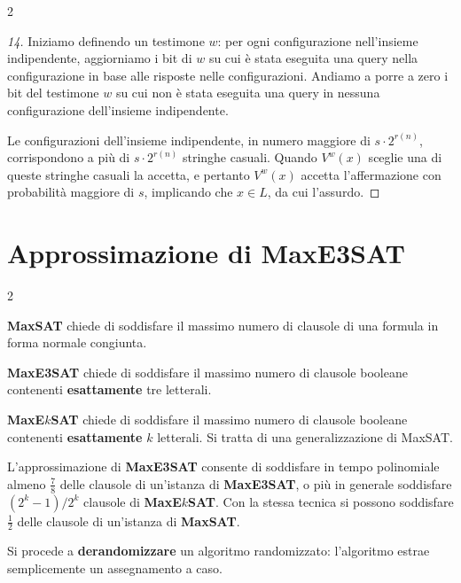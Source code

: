 \documentclass[\main/main.tex]{subfiles}
\begin{document}
\begin{multicols}{2}
\begin{proof}[14]
    Iniziamo definendo un testimone \(w\): per ogni configurazione nell'insieme indipendente, aggiorniamo i bit di \(w\) su cui è stata eseguita una query nella configurazione in base alle risposte nelle configurazioni. Andiamo a porre a zero i bit del testimone \(w\) su cui non è stata eseguita una query in nessuna configurazione dell'insieme indipendente.
    
    Le configurazioni dell'insieme indipendente, in numero maggiore di \(s \cdot 2^{r(n)}\), corrispondono a più di \(s \cdot 2^{r(n)}\) stringhe casuali. Quando \(V^{w}(x)\) sceglie una di queste stringhe casuali la accetta, e pertanto \(V^{w}(x)\) accetta l'affermazione con probabilità maggiore di \(s\), implicando che \(x \in L\), da cui l'assurdo.
\end{proof}
\end{multicols}
\clearpage
\section{Approssimazione di MaxE3SAT}
\begin{multicols}{2}
\begin{problem}[MaxSAT]
    \textbf{MaxSAT} chiede di soddisfare il massimo numero di clausole di una formula in forma normale congiunta.
\end{problem}
\begin{problem}
    \textbf{MaxE3SAT} chiede di soddisfare il massimo numero di clausole booleane contenenti \textbf{esattamente} tre letterali.
\end{problem}
\begin{problem}
    \textbf{MaxE\(k\)SAT} chiede di soddisfare il massimo numero di clausole booleane contenenti \textbf{esattamente} \(k\) letterali. Si tratta di una generalizzazione di MaxSAT.
\end{problem}
\begin{observation}
    L'approssimazione di \textbf{MaxE3SAT} consente di soddisfare in tempo polinomiale almeno \(\frac{7}{8}\) delle clausole di un'istanza di \textbf{MaxE3SAT}, o più in generale soddisfare \(\left(2^{k}-1\right) / 2^{k}\) clausole di \textbf{MaxE\(k\)SAT}. Con la stessa tecnica si possono soddisfare \(\frac{1}{2}\) delle clausole di un'istanza di \textbf{MaxSAT}.
\end{observation}
\begin{observation}
    Si procede a \textbf{derandomizzare} un algoritmo randomizzato: l'algoritmo estrae semplicemente un assegnamento a caso.
\end{observation}
\end{multicols}
\end{document}
